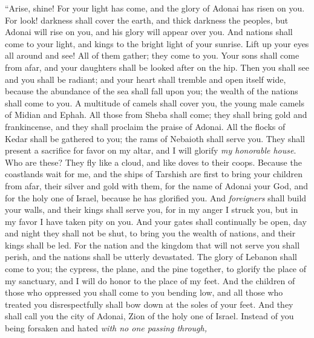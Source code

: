 \begin{biblechapter} %
 “Arise, shine! For your light has come, 
and the glory of Adonai has risen on you.
\verse For look! darkness shall cover the earth, 
and thick darkness the peoples, 
but Adonai will rise on you, 
and his glory will appear over you.
\verse And nations shall come to your light, 
and kings to the bright light of your sunrise.
\verse Lift up your eyes all around and see! 
All of them gather; they come to you. 
Your sons shall come from afar, 
and your daughters shall be looked after on the hip.
\verse Then you shall see 
and you shall be radiant; 
and your heart shall tremble 
and open itself wide, 
because the abundance of the sea shall fall upon you; 
the wealth of the nations shall come to you.
\verse A multitude of camels shall cover you, 
the young male camels of Midian and Ephah. 
All those from Sheba shall come; 
they shall bring gold and frankincense, 
and they shall proclaim the praise of Adonai.
\verse All the flocks of Kedar shall be gathered to you; 
the rams of Nebaioth shall serve you. 
They shall present a sacrifice for favor on my altar, 
and I will glorify \textit{my honorable house}.
\verse Who are these? They fly like a cloud, 
and like doves to their coops.
\verse Because the coastlands wait for me, 
and the ships of Tarshish are first 
to bring your children from afar, 
their silver and gold with them, 
for the name of Adonai your God, 
and for the holy one of Israel, because he has glorified you.
\verse And \textit{foreigners} shall build your walls, 
and their kings shall serve you, 
for in my anger I struck you, 
but in my favor I have taken pity on you.
\verse And your gates shall continually be open, 
day and night they shall not be shut, 
to bring you the wealth of nations, 
and their kings shall be led.
\verse For the nation and the kingdom that will not serve you shall perish, 
and the nations shall be utterly devastated.
\verse The glory of Lebanon shall come to you; 
the cypress, the plane, and the pine together, 
to glorify the place of my sanctuary, 
and I will do honor to the place of my feet.
\verse And the children of those who oppressed you shall come to you bending low, 
and all those who treated you disrespectfully shall bow down at the soles of your feet. 
And they shall call you the city of Adonai, 
Zion of the holy one of Israel.
\verse Instead of you being forsaken 
and hated \textit{with no one passing through,} 

\end{biblechapter}
